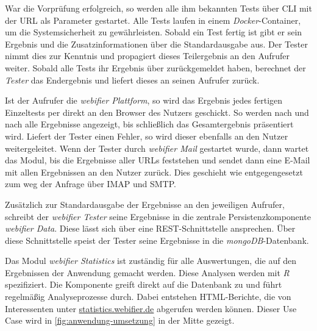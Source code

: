 War die Vorprüfung erfolgreich, so werden alle ihm bekannten Tests über \ac{CLI} mit der \ac{URL} als Parameter gestartet.
Alle Tests laufen in einem \textit{Docker}-Container, um die Systemsicherheit zu gewährleisten.
Sobald ein Test fertig ist gibt er sein Ergebnis und die Zusatzinformationen über die Standardausgabe aus.
Der Tester nimmt dies zur Kenntnis und propagiert dieses Teilergebnis an den Aufrufer weiter.
Sobald alle Tests ihr Ergebnis über zurückgemeldet haben, berechnet der \textit{Tester} das Endergebnis und liefert dieses an seinen Aufrufer zurück.

Ist der Aufrufer die \textit{webifier Plattform}, so wird das Ergebnis jedes fertigen Einzeltests per direkt an den Browser des Nutzers geschickt.
So werden nach und nach alle Ergebnisse angezeigt, bis schließlich das Gesamtergebnis präsentiert wird.
Liefert der Tester einen Fehler, so wird dieser ebenfalls an den Nutzer weitergeleitet.
Wenn der Tester durch \textit{webifier Mail} gestartet wurde, dann wartet das Modul, bis die Ergebnisse aller \acp{URL} feststehen und sendet dann eine E-Mail mit allen Ergebnissen an den Nutzer zurück.
Dies geschieht wie entgegengesetzt zum weg der Anfrage über \ac{IMAP} und \ac{SMTP}.

Zusätzlich zur Standardausgabe der Ergebnisse an den jeweiligen Aufrufer, schreibt der \textit{webifier Tester} seine Ergebnisse in die zentrale Persistenzkomponente \textit{webifier Data}.
Diese lässt sich über eine \ac{REST}-Schnittstelle ansprechen.
Über diese Schnittstelle speist der Tester seine Ergebnisse in die \textit{mongoDB}-Datenbank.

Das Modul \textit{webifier Statistics} ist zuständig für alle Auswertungen, die auf den Ergebnissen der Anwendung gemacht werden.
Diese Analysen werden mit \textit{R} spezifiziert.
Die Komponente greift direkt auf die Datenbank zu und führt regelmäßig Analyseprozesse durch.
Dabei entstehen \ac{HTML}-Berichte, die von Interessenten unter \url{statistics.webifier.de}
abgerufen werden können.
Dieser Use Case wird in \autoref{fig:anwendung-umsetzung} in der Mitte gezeigt.

